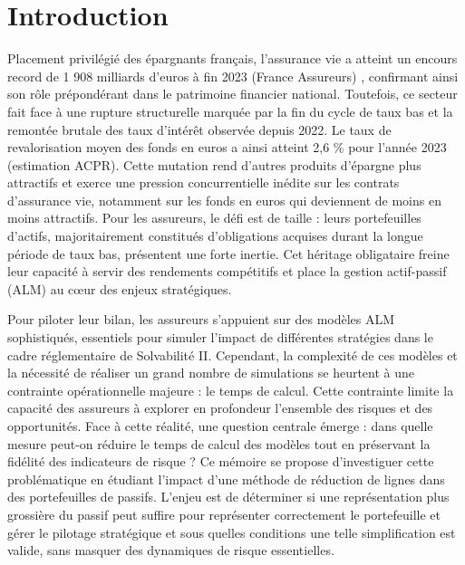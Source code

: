 \chapter*{Introduction}

Placement privilégié des épargnants français, l'assurance vie a atteint un encours record de 1 908 milliards d'euros à fin 2023 (France Assureurs) \cite{site_web}, confirmant ainsi son rôle prépondérant dans le patrimoine financier national. Toutefois, ce secteur fait face à une rupture structurelle marquée par la fin du cycle de taux bas et la remontée brutale des taux d'intérêt observée depuis 2022. Le taux de revalorisation moyen des fonds en euros a ainsi atteint 2,6 \% pour l'année 2023 (estimation ACPR). Cette mutation rend d'autres produits d'épargne plus attractifs et exerce une pression concurrentielle inédite sur les contrats d'assurance vie, notamment sur les fonds en euros qui deviennent de moins en moins attractifs. Pour les assureurs, le défi est de taille : leurs portefeuilles d'actifs, majoritairement constitués d'obligations acquises durant la longue période de taux bas, présentent une forte inertie. Cet héritage obligataire freine leur capacité à servir des rendements compétitifs et place la gestion actif-passif (ALM) au cœur des enjeux stratégiques.

Pour piloter leur bilan, les assureurs s'appuient sur des modèles ALM sophistiqués, essentiels pour simuler l'impact de différentes stratégies dans le cadre réglementaire de Solvabilité II. Cependant, la complexité de ces modèles et la nécessité de réaliser un grand nombre de simulations se heurtent à une contrainte opérationnelle majeure : le temps de calcul. Cette contrainte limite la capacité des assureurs à explorer en profondeur l'ensemble des risques et des opportunités. Face à cette réalité, une question centrale émerge : dans quelle mesure peut-on réduire le temps de calcul des modèles tout en préservant la fidélité des indicateurs de risque ? Ce mémoire se propose d'investiguer cette problématique en étudiant l'impact d'une méthode de réduction de lignes dans des portefeuilles de passifs. L'enjeu est de déterminer si une représentation plus grossière du passif peut suffire pour représenter correctement le portefeuille et gérer le pilotage stratégique et sous quelles conditions une telle simplification est valide, sans masquer des dynamiques de risque essentielles.

